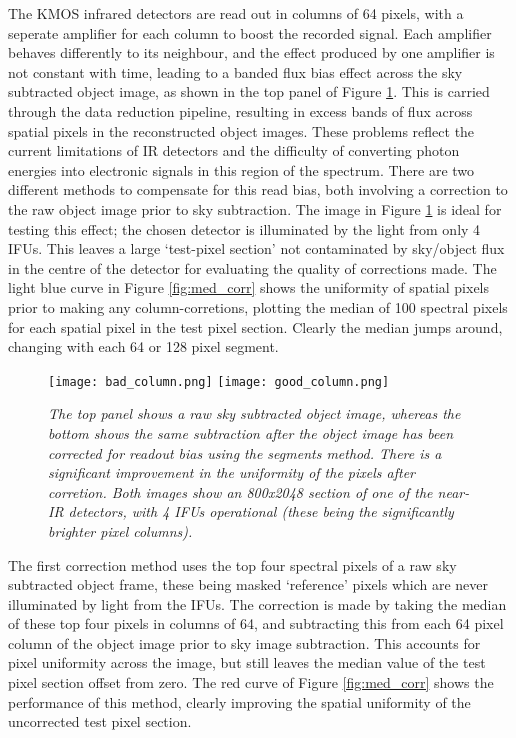 \documentclass{literature}
\begin{document}
The KMOS infrared detectors are read out in columns of 64 pixels, with a seperate amplifier for each column to boost the recorded signal. Each amplifier behaves differently to its neighbour, and the effect produced by one amplifier is not constant with time, leading to a banded flux bias effect across the sky subtracted object image, as shown in the top panel of Figure \ref{fig:column_sub}. This is carried through the data reduction pipeline, resulting in excess bands of flux across spatial pixels in the reconstructed object images. These problems reflect the current limitations of IR detectors and the difficulty of converting photon energies into electronic signals in this region of the spectrum. There are two different methods to compensate for this read bias, both involving a correction to the raw object image prior to sky subtraction. The image in Figure \ref{fig:column_sub} is ideal for testing this effect; the chosen detector is illuminated by the light from only 4 IFUs. This leaves a large `test-pixel section' not contaminated by sky/object flux in the centre of the detector for evaluating the quality of corrections made. The light blue curve in Figure \ref{fig:med_corr} shows the uniformity of spatial pixels prior to making any column-corretions, plotting the median of 100 spectral pixels for each spatial pixel in the test pixel section. Clearly the median jumps around, changing with each 64 or 128 pixel segment. \\ 

\begin{figure}[!htp]
\centering
\texttt{[image: bad\_column.png]}
\texttt{[image: good\_column.png]}
\caption{\footnotesize{\emph{The top panel shows a raw sky subtracted object image, whereas the bottom shows the same subtraction after the object image has been corrected for readout bias using the segments method. There is a significant improvement in the uniformity of the pixels after corretion. Both images show an 800x2048 section of one of the near-IR detectors, with 4 IFUs operational (these being the significantly brighter pixel columns).}}}
\label{fig:column_sub}
\end{figure}

The first correction method uses the top four spectral pixels of a raw sky subtracted object frame, these being masked `reference' pixels which are never illuminated by light from the IFUs. The correction is made by taking the median of these top four pixels in columns of 64, and subtracting this from each 64 pixel column of the object image prior to sky image subtraction. This accounts for pixel uniformity across the image, but still leaves the median value of the test pixel section offset from zero. The red curve of Figure \ref{fig:med_corr} shows the performance of this method, clearly improving the spatial uniformity of the uncorrected test pixel section.  \\ 
\end{document}
